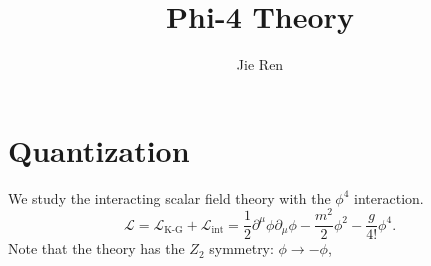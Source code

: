 \documentclass[aps,prb,superscriptaddress,nofootinbib]{revtex4}
\begin{document}
\title{Phi-4 Theory}
\author{Jie Ren}


\maketitle



\tableofcontents

\section{Quantization}
We study the interacting scalar field theory with the $\phi^4$ interaction.
\begin{equation*}
	\mathcal L = \mathcal L_\text{K-G} + \mathcal L_{\mathrm{int}}
	= \frac{1}{2}\partial^\mu \phi \partial_\mu \phi -\frac{m^2}{2}\phi^2 -\frac{g}{4!}\phi^4.
\end{equation*}
Note that the theory has the $Z_2$ symmetry: $\phi \rightarrow -\phi$, 
\end{document}
